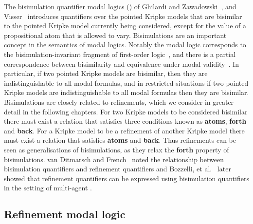 The bisimulation quantifier modal logics (\logicBqml{}) of Ghilardi and Zawadowski~\cite{ghilardi:2002}, and Visser~\cite{visser:1996} introduces quantifiers over the pointed Kripke models that are bisimilar to the pointed Kripke model currently being considered, except for the value of a propositional atom that is allowed to vary.
Bisimulations are an important concept in the semantics of modal logics.
Notably the modal logic \logicK{} corresponds to the bisimulation-invariant fragment of first-order logic~\cite{vanbenthem:1984}, and there is a partial correspondence between bisimilarity and equivalence under modal validity~\cite{goranko:2006}.
In particular, if two pointed Kripke models are bisimilar, then they are indistinguishable to all modal formulas, and in restricted situations if two pointed Kripke models are indistinguishable to all modal formulas then they are bisimilar.
Bisimulations are closely related to refinements, which we consider in greater detail in the following chapters.
For two Kripke models to be considered bisimilar there must exist a relation that satisfies three conditions known as {\bf atoms}, {\bf forth} and {\bf back}.
For a Kripke model to be a refinement of another Kripke model there must exist a relation that satisfies {\bf atoms} and {\bf back}.
Thus refinements can be seen as generalisations of bisimulations, as they relax the {\bf forth} property of bisimulations.
van Ditmarsch and French~\cite{vanditmarsch:2009} noted the relationship between bisimulation quantifiers and refinement quantifiers and Bozzelli, et al.~\cite{bozzelli:2014b} later showed that refinement quantifiers can be expressed using bisimulation quantifiers in the setting of multi-agent \classK{}.

\subsection{Refinement modal logic}


